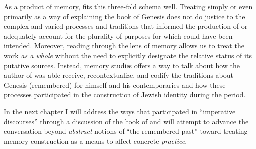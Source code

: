 As a product of memory, \ga fits this three-fold schema well. Treating \ga simply or even primarily as a way of explaining the book of Genesis does not do justice to the complex and varied processes and traditions that informed the production of \ga or adequately account for the plurality of purposes for which \ga could have been intended. Moreover, reading \ga through the lens of memory allows us to treat the work \emph{as a whole} without the need to explicitly designate the relative status of its putative sources. Instead, memory studies offers a way to talk about how the author of \ga was able receive, recontextualize, and codify the traditions about Genesis (remembered) for himself and his contemporaries and how these processes participated in the construction of Jewish identity during the \secondtemple period.

In the next chapter I will address the ways that \rwb participated in ``imperative discourses'' through a discussion of the book of \jub and will attempt to advance the conversation beyond \emph{abstract} notions of ``the remembered past'' toward treating memory construction as a means to affect concrete \emph{practice}.